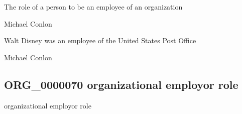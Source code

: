 \documentclass[letterpaper,10pt,english]{sphinxmanual}
\begin{document}
\begin{sphinxShadowBox}

\sphinxAtStartPar
{\hyperref[\detokenize{doc-BFO_0000023::doc}]{}}
\end{sphinxShadowBox}

\begin{sphinxShadowBox}

\sphinxAtStartPar
The role of a person to be an employee of an organization
\end{sphinxShadowBox}

\begin{sphinxShadowBox}

\sphinxAtStartPar
Michael Conlon 
\end{sphinxShadowBox}

\begin{sphinxShadowBox}

\sphinxAtStartPar
Walt Disney was an employee of the United States Post Office
\end{sphinxShadowBox}

\begin{sphinxShadowBox}

\sphinxAtStartPar
Michael Conlon 
\end{sphinxShadowBox}
\begin{quote}

\ignorespaces \end{quote}


\subsection{ORG\_0000070 \sphinxhyphen{} organizational employor role}
\label{\detokenize{doc-ORG_0000070:org-0000070-organizational-employor-role}}\label{\detokenize{doc-ORG_0000070:index-0}}\label{\detokenize{doc-ORG_0000070::doc}}
\begin{sphinxShadowBox}

\sphinxAtStartPar
organizational employor role
\end{sphinxShadowBox}
\end{document}

